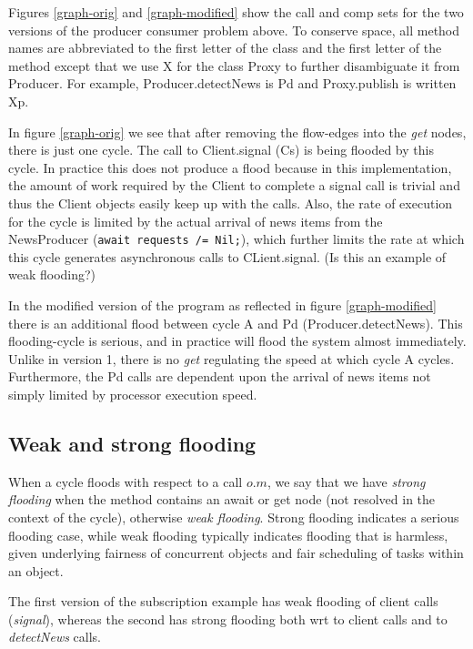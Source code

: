 \documentclass[12pt]{article}%
\begin{document}
Figures \ref{graph-orig} and \ref{graph-modified} show the call and comp sets
for the two versions of the producer consumer problem above. To conserve space, all method names are abbreviated to the
first letter of the class and the first letter of the method except that we use X for the class Proxy to further disambiguate it from Producer. 
For example, Producer.detectNews is Pd and Proxy.publish is written Xp.

In figure \ref{graph-orig} we see that after removing the flow-edges into the \emph{get} nodes, there is just one cycle.
The call to Client.signal (Cs) is being flooded by this cycle.
In practice this does not produce a flood because in this implementation, the amount of work required by the
Client to complete a signal call is trivial and thus the Client objects easily keep up with the calls. 
Also, the rate of execution for the cycle is
limited by the actual arrival of news items from the NewsProducer (\lstinline{await requests /= Nil;}), 
which further limits the rate at which this cycle generates asynchronous calls to
CLient.signal. (Is this an example of weak flooding?)

In the modified version of the program as reflected in figure \ref{graph-modified} there is an additional flood between cycle A and
Pd (Producer.detectNews). This flooding-cycle is serious, and in practice will flood the system almost immediately.
Unlike in version 1, there is no \emph{get} regulating the speed at which cycle A cycles. Furthermore, the Pd calls are dependent upon the
arrival of news items not simply limited by processor execution speed.

\subsection{Weak and strong flooding}
When a cycle floods with respect to a call $o.m$,
we say that we have \emph{strong flooding} 
when the method contains an  await or get node
(not resolved in the context of the cycle),
otherwise \emph{weak flooding}.
Strong flooding indicates a serious flooding case,
while weak flooding typically indicates flooding 
that is harmless, given underlying fairness of concurrent objects
and  fair scheduling of tasks within an object. 

The first version of the subscription example
has weak flooding of client calls (\emph{signal}),
whereas the second has strong flooding both wrt
to client calls and  to \emph{detectNews} calls.
\end{document}
